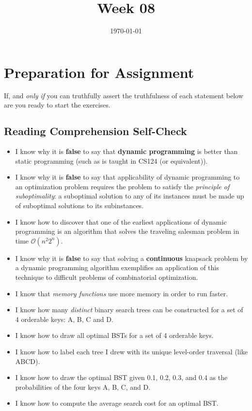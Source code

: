 \documentclass[12pt]{amsart}
\title{Week 08}
\date{\today}
\begin{document}
\maketitle

\section{Preparation for Assignment}
If, and \textit{only if} you can truthfully assert the truthfulness of each statement below are you ready to start the exercises.
\subsection {Reading Comprehension Self-Check}
\begin{itemize}
\item I know why it is \textbf{false} to say that \textbf{dynamic programming} is better than static programming (such as is taught in CS124 (or equivalent)).
 \item I know why it is \textbf{false} to say that applicability of dynamic programming to an optimization problem requires the problem to satisfy the \textit{principle of suboptimality}: a suboptimal solution to any of its instances must be made up of suboptimal solutions to its subinstances.
 \item I know how to discover that one of the earliest applications of dynamic programming is an algorithm that solves the traveling salesman problem in time $\mathcal{O}(n^2 2^n)$.
 \item I know why it is \textbf{false} to say that solving a \textbf{continuous} knapsack problem by a dynamic programming algorithm exemplifies an application of this technique to difficult problems of combinatorial optimization.
 \item I know that \textit{memory functions} use more memory in order to run faster.
  
\item I know how many \textit{distinct} binary search trees can be constructed for a set of 4 orderable keys: A, B, C and D.
\item I know how to draw all optimal BSTs for a set of 4 orderable keys.
\item I know how to label each tree I drew with its unique level-order
    traversal (like ABCD).
\item I know how to draw the optimal BST given 0.1, 0.2, 0.3, and 0.4 as the probabilities of the four keys A, B, C, and D.
\item I know how to compute the average search cost for an optimal BST.
\end{itemize}
\end{document}
